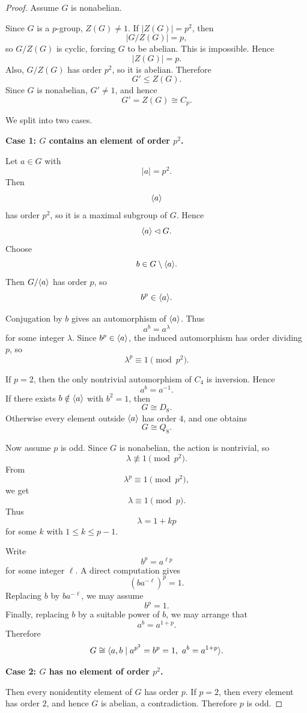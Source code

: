 \begin{proof}
Assume \(G\) is nonabelian.

Since \(G\) is a \(p\)-group, \(Z(G)\neq 1\). If \(|Z(G)|=p^2\), then
\[
    |G/Z(G)|=p,
\]
so \(G/Z(G)\) is cyclic, forcing \(G\) to be abelian. This is impossible. Hence
\[
    |Z(G)|=p.
\]
Also, \(G/Z(G)\) has order \(p^2\), so it is abelian. Therefore
\[
    G'\leq Z(G).
\]
Since \(G\) is nonabelian, \(G'\neq 1\), and hence
\[
    G'=Z(G)\cong C_p.
\]

We split into two cases.

\medskip

\noindent\textbf{Case 1: \(G\) contains an element of order \(p^2\).}

Let \(a\in G\) with
\[
    |a|=p^2.
\]
Then
\[
    \langle a\rangle
\]
has order \(p^2\), so it is a maximal subgroup of \(G\). Hence
\[
    \langle a\rangle\lhd G.
\]
Choose
\[
    b\in G\setminus \langle a\rangle.
\]
Then \(G/\langle a\rangle\) has order \(p\), so
\[
    b^p\in \langle a\rangle.
\]

Conjugation by \(b\) gives an automorphism of \(\langle a\rangle\). Thus
\[
    a^b=a^\lambda
\]
for some integer \(\lambda\). Since \(b^p\in\langle a\rangle\), the induced automorphism has order dividing \(p\), so
\[
    \lambda^p\equiv 1\pmod{p^2}.
\]

If \(p=2\), then the only nontrivial automorphism of \(C_4\) is inversion. Hence
\[
    a^b=a^{-1}.
\]
If there exists \(b\notin\langle a\rangle\) with \(b^2=1\), then
\[
    G\cong D_8.
\]
Otherwise every element outside \(\langle a\rangle\) has order \(4\), and one obtains
\[
    G\cong Q_8.
\]

Now assume \(p\) is odd. Since \(G\) is nonabelian, the action is nontrivial, so
\[
    \lambda\not\equiv 1\pmod{p^2}.
\]
From
\[
    \lambda^p\equiv 1\pmod{p^2},
\]
we get
\[
    \lambda\equiv 1\pmod p.
\]
Thus
\[
    \lambda=1+kp
\]
for some \(k\) with \(1\leq k\leq p-1\).

Write
\[
    b^p=a^{\ell p}
\]
for some integer \(\ell\). A direct computation gives
\[
    (ba^{-\ell})^p=1.
\]
Replacing \(b\) by \(ba^{-\ell}\), we may assume
\[
    b^p=1.
\]
Finally, replacing \(b\) by a suitable power of \(b\), we may arrange that
\[
    a^b=a^{1+p}.
\]
Therefore
\[
    G\cong
    \langle 
        a,b
        \mid
        a^{p^2}=b^p=1,\ a^b=a^{1+p}
    \rangle.
\]

\medskip

\noindent\textbf{Case 2: \(G\) has no element of order \(p^2\).}

Then every nonidentity element of \(G\) has order \(p\). If \(p=2\), then every element has order \(2\), and hence \(G\) is abelian, a contradiction. Therefore \(p\) is odd.


\end{proof}
